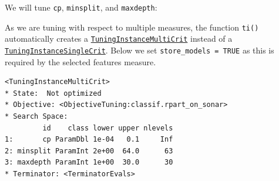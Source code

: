 We will tune \texttt{cp}, \texttt{minsplit}, and \texttt{maxdepth}:

\begin{Shaded}
\begin{Highlighting}[]
\OtherTok{=} \NormalTok{(}\NormalTok{, } \NormalTok{(}\NormalTok{, }\NormalTok{),}
   \NormalTok{(}\NormalTok{, }\NormalTok{), } \NormalTok{(}\NormalTok{, }\NormalTok{))}

\OtherTok{=} \NormalTok{(}\NormalTok{(}\NormalTok{, }\NormalTok{))}
\end{Highlighting}
\end{Shaded}

As we are tuning with respect to multiple measures, the function
\texttt{ti()} automatically creates a
\href{https://mlr3tuning.mlr-org.com/reference/TuningInstanceMultiCrit.html}{\texttt{TuningInstanceMultiCrit}}
instead of a
\href{https://mlr3tuning.mlr-org.com/reference/TuningInstanceSingleCrit.html}{\texttt{TuningInstanceSingleCrit}}.
Below we set \texttt{store\_models\ =\ TRUE} as this is required by the
selected features measure.

\begin{Shaded}
\begin{Highlighting}[]
\OtherTok{=} \NormalTok{(}
   \NormalTok{(}\NormalTok{),}
   \NormalTok{(}\NormalTok{, } \NormalTok{),}
   \NormalTok{(}\NormalTok{, } \NormalTok{),}
   
\NormalTok{)}
\end{Highlighting}
\end{Shaded}

\begin{verbatim}
<TuningInstanceMultiCrit>
* State:  Not optimized
* Objective: <ObjectiveTuning:classif.rpart_on_sonar>
* Search Space:
         id    class lower upper nlevels
1:       cp ParamDbl 1e-04   0.1     Inf
2: minsplit ParamInt 2e+00  64.0      63
3: maxdepth ParamInt 1e+00  30.0      30
* Terminator: <TerminatorEvals>
\end{verbatim}

